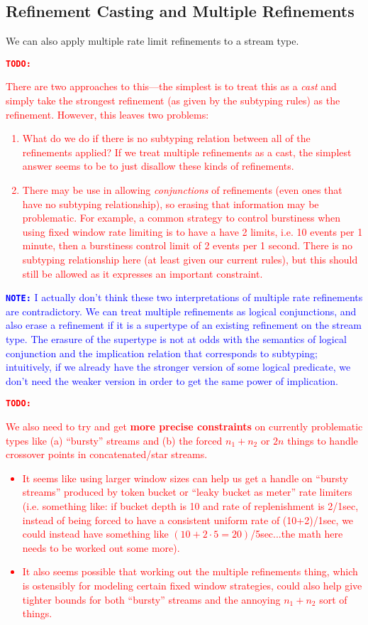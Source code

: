 \documentclass[acmsmall,nonacm,screen]{acmart}
\newcommand{\todo}[1]{\textcolor{red}{\textbf{\texttt{TODO:}} {#1}}}
\newcommand{\note}[1]{\textcolor{blue}{\textbf{\texttt{NOTE:}} {#1}}}
\begin{document}
\subsection{Refinement Casting and Multiple Refinements}
We can also apply multiple rate limit refinements to a stream type. \todo{There are two approaches to this—the simplest is to treat this as a \textit{cast} and simply take the strongest refinement (as given by the subtyping rules) as the refinement. However, this leaves two problems:
  \begin{enumerate}
  \item What do we do if there is no subtyping relation between all of the refinements applied? If we treat multiple refinements as a cast, the simplest answer seems to be to just disallow these kinds of refinements.
  \item There may be use in allowing \textit{conjunctions} of refinements (even ones that have no subtyping relationship), so erasing that information may be problematic. For example, a common strategy to control burstiness when using fixed window rate limiting is to have a have 2 limits, i.e. 10 events per 1 minute, then a burstiness control limit of 2 events per 1 second. There is no subtyping relationship here (at least given our current rules), but this should still be allowed as it expresses an important constraint.
  \end{enumerate}}

\note{I actually don't think these two interpretations of multiple rate refinements are contradictory. We can treat multiple refinements as logical conjunctions, and also erase a refinement if it is a supertype of an existing refinement on the stream type. The erasure of the supertype is not at odds with the semantics of logical conjunction and the implication relation that corresponds to subtyping; intuitively, if we already have the stronger version of some logical predicate, we don't need the weaker version in order to get the same power of implication.}

\todo{We also need to try and get \textbf{more precise constraints} on currently problematic types like (a) ``bursty'' streams and (b) the forced $n_1+n_2$ or $2n$ things to handle crossover points in concatenated/star streams.
  \begin{itemize}
  \item It seems like using larger window sizes can help us get a handle on ``bursty streams'' produced by token bucket or ``leaky bucket as meter'' rate limiters (i.e. something like: if bucket depth is 10 and rate of replenishment is 2/1sec, instead of being forced to have a consistent uniform rate of (10+2)/1sec, we could instead have something like $(10+2\cdot 5 = 20)$/5sec...the math here needs to be worked out some more).
  \item It also seems possible that working out the multiple refinements thing, which is ostensibly for modeling certain fixed window strategies, could also help give tighter bounds for both ``bursty'' streams and the annoying $n_1+n_2$ sort of things.
  \end{itemize}}
\end{document}
